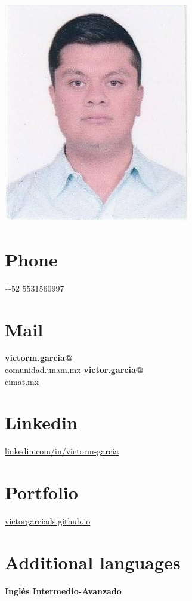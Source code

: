 \documentclass[]{friggeri-cv}
\begin{document}
\begin{aside}
  \includegraphics[scale=0.268]{img/foto2.png}
  \section{Phone}
    +52 5531560997
  \section{Mail}
    \href{mailto:victorm.garcia@comunidad.unam.mx}{\textbf{victorm.garcia@}\\comunidad.unam.mx}
    \href{mailto:victor.garcia@cimat.mx}{\textbf{victor.garcia@}\\cimat.mx}
    \section{Linkedin}
    \url{linkedin.com/in/victorm-garcia}%
    \section{Portfolio}
    \url{victorgarciads.github.io}%
     \section{Additional languages}
    \textbf{Inglés Intermedio-Avanzado}

\end{aside}
\end{document}
